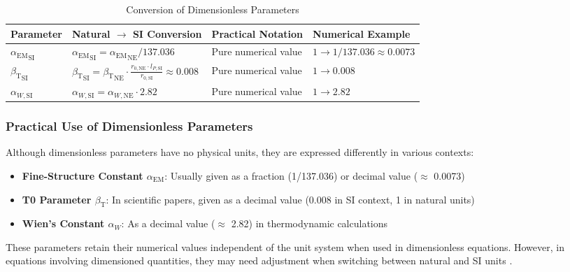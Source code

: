\documentclass[12pt,a4paper]{article}
\newcommand{\alphaEM}{\alpha_{\text{EM}}}
\newcommand{\betaT}{\beta_{\text{T}}}
\begin{document}
	\begin{table}[ht]
		\centering
		\begin{adjustbox}{scale=0.85}
			\begin{tabular}{llll}
				\hline
				\textbf{Parameter} & \textbf{Natural $\to$ SI Conversion} & \textbf{Practical Notation} & \textbf{Numerical Example} \\
				\hline
				${\alphaEM}_{\text{SI}}$ & ${\alphaEM}_{\text{SI}} = {\alphaEM}_{\text{NE}}/137.036$ & Pure numerical value & $1 \to 1/137.036 \approx 0.0073$ \\
				${\betaT}_{\text{SI}}$ & ${\betaT}_{\text{SI}} = {\betaT}_{\text{NE}} \cdot \frac{r_{0,\text{NE}}\cdot l_{P,\text{SI}}}{r_{0,\text{SI}}} \approx 0.008$ & Pure numerical value & $1 \to 0.008$ \\
				$\alpha_{W,\text{SI}}$ & $\alpha_{W,\text{SI}} = \alpha_{W,\text{NE}} \cdot 2.82$ & Pure numerical value & $1 \to 2.82$ \\
				\hline
			\end{tabular}
		\end{adjustbox}
		\caption{Conversion of Dimensionless Parameters}
		\label{tab:dimensionless_conversion}
	\end{table}
	
	\subsubsection{Practical Use of Dimensionless Parameters}
	
	Although dimensionless parameters have no physical units, they are expressed differently in various contexts:
	
	\begin{itemize}
		\item \textbf{Fine-Structure Constant $\alphaEM$}: Usually given as a fraction (1/137.036) or decimal value ($\approx$ 0.0073)
		\item \textbf{T0 Parameter $\betaT$}: In scientific papers, given as a decimal value (0.008 in SI context, 1 in natural units)
		\item \textbf{Wien’s Constant $\alpha_W$}: As a decimal value ($\approx$ 2.82) in thermodynamic calculations
	\end{itemize}
	
	These parameters retain their numerical values independent of the unit system when used in dimensionless equations. However, in equations involving dimensioned quantities, they may need adjustment when switching between natural and SI units \cite{pascher_alpha_2025, pascher_beta_2025}.
	
\end{document}
